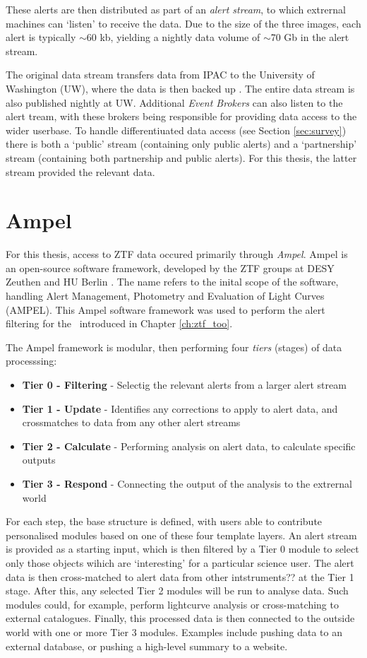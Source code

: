  These alerts are then distributed as part of an \emph{alert stream}, to which extrernal machines can `listen' to receive the data. Due to the size of the three images, each alert is typically $\sim$60 kb, yielding a nightly data volume of $\sim$70 Gb in the alert stream.  

The original data stream transfers data from IPAC to the University of Washington (UW), where the data is then backed up \cite{zads_19}. The entire data stream is also published nightly at UW. Additional \emph{Event Brokers} can also listen to the alert tream, with these brokers being responsible for providing data access to the wider userbase. To handle differentiuated data access (see Section \ref{sec:survey}) there is both a `public' stream (containing only public alerts)  and a  `partnership' stream (containing both partnership and public alerts). For this thesis, the latter stream provided the relevant data.

\section{Ampel}

For this thesis, access to ZTF data occured primarily through \emph{Ampel}. Ampel is an open-source  software framework, developed by the ZTF groups at DESY Zeuthen and HU Berlin . The name refers to the inital scope of the software, handling Alert Management, Photometry and Evaluation of Light Curves (AMPEL). This Ampel software framework was used to perform the alert filtering for the \ztf ~introduced in Chapter \ref{ch:ztf_too}.

The Ampel framework is modular, then performing four \emph{tiers} (stages) of data processsing:

\begin{itemize}
	\item \textbf{Tier 0 - Filtering} - Selectig the relevant alerts from a larger alert stream
	\item \textbf{Tier 1 - Update} - Identifies any corrections to apply to alert data, and crossmatches to data from any other alert streams
	\item \textbf{Tier 2 - Calculate} - Performing analysis on alert data, to calculate specific outputs
	\item \textbf{Tier 3 - Respond} - Connecting the output of the analysis to the extrernal world
\end{itemize}

For each step, the base structure is defined, with users able to contribute personalised modules based on one of these four template layers. An alert stream is provided as a starting input, which is then filtered by a Tier 0 module to select only those objects wihich are `interesting' for a particular science user. The alert data is then cross-matched to alert data from other intstruments?? at the Tier 1 stage. After this, any selected Tier 2 modules will be run to analyse data. Such modules could, for example, perform lightcurve analysis or cross-matching to external catalogues. Finally, this processed data is then connected to the outside world with one or more Tier 3 modules. Examples include pushing data to an external database, or pushing a high-level summary to a website. 

